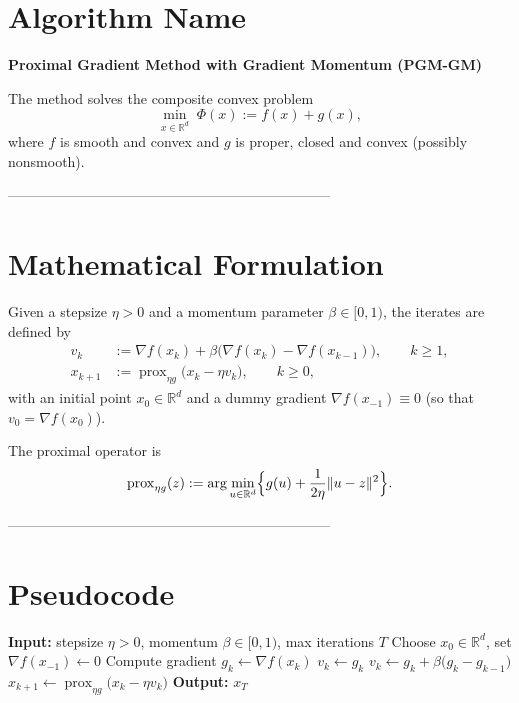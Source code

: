 \documentclass{article}
\newcommand{\prox}{\operatorname{prox}}
\newcommand{\R}{\mathbb{R}}
\begin{document}
\section*{Algorithm Name}
\textbf{Proximal Gradient Method with Gradient Momentum (PGM-GM)}  

The method solves the composite convex problem  
\[
\min_{x\in\R^{d}}\; \Phi(x):= f(x)+g(x),
\]
where $f$ is smooth and convex and $g$ is proper, closed and convex (possibly nonsmooth).

---------------------------------------------------------------------

\section*{Mathematical Formulation}
Given a stepsize $\eta>0$ and a momentum parameter $\beta\in[0,1)$, the iterates are defined by  
\begin{align}
v_k &:= \nabla f(x_k)+\beta\bigl(\nabla f(x_k)-\nabla f(x_{k-1})\bigr), \qquad k\ge 1, \label{eq:momentum}\\[4pt]
x_{k+1} &:= \prox_{\eta g}\!\bigl(x_k-\eta v_k\bigr), \qquad k\ge 0, \label{eq:update}
\end{align}
with an initial point $x_0\in\R^{d}$ and a dummy gradient $\nabla f(x_{-1})\equiv0$ (so that $v_0=\nabla f(x_0)$).

The proximal operator is
\[
\prox_{\eta g}(z):=\arg\min_{u\in\R^{d}}\Bigl\{ g(u)+\frac{1}{2\eta}\|u-z\|^{2}\Bigr\}.
\]

---------------------------------------------------------------------

\section*{Pseudocode}
\begin{algorithm}[H]
\caption{PGM-GM}
\begin{algorithmic}[1]
\STATE \textbf{Input:} stepsize $\eta>0$, momentum $\beta\in[0,1)$, max iterations $T$
\STATE Choose $x_0\in\R^{d}$, set $\nabla f(x_{-1})\gets0$
    \STATE Compute gradient $g_k\gets \nabla f(x_k)$
        \STATE $v_k\gets g_k$ 
    \ELSE
        \STATE $v_k\gets g_k+\beta\bigl(g_k-g_{k-1}\bigr)$ \label{alg:momentum}
    \ENDIF
    \STATE $x_{k+1}\gets \prox_{\eta g}\!\bigl(x_k-\eta v_k\bigr)$ \label{alg:update}
\ENDFOR
\STATE \textbf{Output:} $x_T$
\end{algorithmic}
\end{algorithm}
\end{document}
